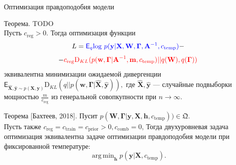 \documentclass[usenames,dvipsnames,11pt,pdf,utf8,russian,aspectratio=43]{beamer}
\DeclareMathOperator*{\argmin}{arg\,min}
\begin{document}
\begin{frame}{Оптимизация правдоподобия модели}
\footnotesize
\begin{block}{Теорема.}
TODO\\
Пусть $c_\text{reg} > 0.$ Тогда оптимизация функции \[L = 
\textcolor{blue}{\mathsf{E}_q \text{log}~{p(\mathbf{y} | \mathbf{X}, \mathbf{W}, \boldsymbol{\Gamma}, \mathbf{A}^{-1}, c_{\text{temp}})}} -\]\[- \textcolor{red}{c_\text{reg}\text{D}_{KL}(p(\mathbf{w}, \boldsymbol{\Gamma} |\mathbf{A}^{-1}, \mathbf{m}, c_{\text{temp}}) || q(\mathbf{W}), q(\boldsymbol{\Gamma}))}\] эквивалентна минимизации ожидаемой дивергенции $\mathsf{E}_{\hat{\mathbf{X}}, \hat{\mathbf{y}}\sim p(\mathbf{X}, \mathbf{y})}\text{D}_{KL}(q||p(\mathbf{w}, \boldsymbol{\Gamma} | \hat{\mathbf{X}}, \hat{\mathbf{y}})),$ где $\hat{\mathbf{X}}, \hat{\mathbf{y}}$ --- случайные подвыборки мощностью $\frac{m}{c_\text{reg}}$ из генеральной совопкупности при $n \to \infty$.
\end{block}

\begin{block}{Теорема  [Бахтеев, 2018].}
Пусит $p(\mathbf{W},  \boldsymbol{\Gamma}| \mathbf{y}, \mathbf{X}, \mathbf{h}, c_\text{temp})) \in \mathfrak{Q}.$\\
Пусть также $c_\text{reg}=c_\text{train}=c_\text{prior}>0, c_\text{comb}=0$, 
Тогда двухуровневая задача оптимизация эквивалентна задаче оптимизации правдоподобия модели при фиксированной температуре:
$$\argmin_\mathbf{h} p(\mathbf{y}|\mathbf{X}, c_{\text{temp}}).$$ 
\end{block}
~\\

\end{frame}
\end{document}
